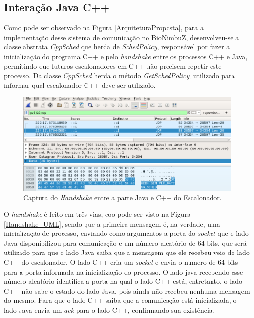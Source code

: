 
\subsection{Interação Java C++}

Como pode ser observado na Figura \ref{ArquiteturaProposta}, para a implementação desse sistema de comunicação no BioNimbuZ, desenvolveu-se a classe abstrata \textit{CppSched} que herda de \textit{SchedPolicy}, responsável por fazer a inicialização do programa C++ e pelo \textit{handshake} entre os processos C++ e Java, permitindo que futuros escalonadores em C++ não precisem repetir este processo. Da classe \textit{CppSched} herda o método \textit{GetSchedPolicy}, utilizado para informar qual escalonador C++ deve ser utilizado.

\begin{figure}[htbp]
	\centerline{\includegraphics[width=13cm]{img/Handshake3.png}}
	\caption{Captura do \textit{Handshake} entre a parte Java e C++ do Escalonador.}
	\label{Handshake}
\end{figure}

O \textit{handshake} é feito em três vias, coo pode ser visto na Figura \ref{Handshake_UML}, sendo que a primeira mensagem é, na verdade, uma inicialização de processo, enviando como argumentos a porta do \textit{socket} que o lado Java disponibilizou para comunicação e um número aleatório de 64 bits, que será utilizado para que o lado Java saiba que a mensagem que ele recebeu veio do lado C++ do escalonador. O lado C++ cria um \textit{socket} e envia o número de 64 bits para a porta informada na inicialização do processo. O lado java recebendo esse número aleatório identifica a porta na qual o lado C++ está, entretanto, o lado C++ não sabe o estado do lado Java, pois ainda não recebeu nenhuma mensagem do mesmo. Para que o lado C++ saiba que a comunicação está inicializada, o lado Java envia um \textit{ack} para o lado C++, confirmando sua existência.

